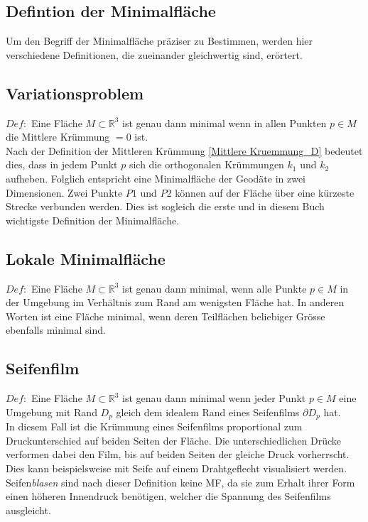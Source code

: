 \begin{refsection}
\section{Defintion der Minimalfläche}
Um den Begriff der Minimalfläche präziser zu Bestimmen, werden hier verschiedene Definitionen, die zueinander gleichwertig sind, erörtert.

\subsection{Variationsproblem}\label{Variationsproblem}
$Def:$ Eine Fläche $ \textit{M} \subset \mathbb{R}^{3} $ ist genau dann minimal wenn in allen Punkten $p \in M$ die Mittlere Krümmung $=0$ ist.\\
Nach der Definition der Mittleren Krümmung \eqref{Mittlere Kruemmung_D} bedeutet dies, dass in jedem Punkt $p$ sich die orthogonalen Krümmungen $k_1$ und $k_2$ aufheben.
Folglich entspricht eine Minimalfläche der Geodäte in zwei Dimensionen. Zwei Punkte $P1$ und $P2$ können auf der Fläche über eine kürzeste Strecke verbunden werden.  Dies ist sogleich die erste und in diesem Buch wichtigste Definition der Minimalfläche.

\subsection{Lokale Minimalfläche}\label{Lokale Minimalflaeche}

$Def:$ Eine Fläche $M\subset\mathbb{R}^{3}$ ist genau dann minimal, wenn alle Punkte $ p \in M $ in der Umgebung  im Verhältnis zum Rand am wenigsten Fläche hat.
In anderen Worten ist eine Fläche minimal, wenn deren Teilflächen beliebiger Grösse ebenfalls minimal sind.  

\subsection{Seifenfilm}\label{Seifenfilm}
$Def:$ Eine Fläche $M\subset\mathbb{R}^{3}$ ist genau dann minimal wenn jeder Punkt $p \in M$ eine Umgebung mit Rand $D_p$ gleich dem idealem Rand eines Seifenfilms $\partial D_p$ hat.\\
In diesem Fall ist die Krümmung eines Seifenfilms proportional zum Druckunterschied auf beiden Seiten der Fläche. Die unterschiedlichen Drücke verformen dabei den Film, bis auf beiden Seiten der gleiche Druck vorherrscht. Dies kann beispielsweise mit Seife auf einem Drahtgeflecht visualisiert werden. Seifen\textit{blasen} sind nach dieser Definition keine MF, da sie zum Erhalt ihrer Form einen höheren Innendruck benötigen, welcher die Spannung des Seifenfilms ausgleicht.






\printbibliography[heading=subbibliography]
\end{refsection}
